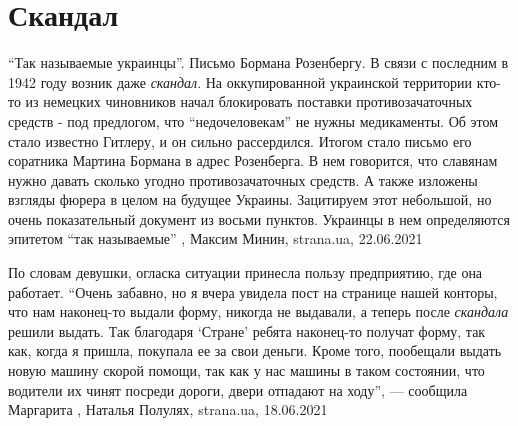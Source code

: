  
 
 
 
 
\chapter{Скандал}
\label{sec:slova.skandal}

\enquote{Так называемые украинцы}. Письмо Бормана Розенбергу.  В связи с последним в
1942 году возник даже \emph{скандал}. На оккупированной украинской территории кто-то
из немецких чиновников начал блокировать поставки противозачаточных средств -
под предлогом, что \enquote{недочеловекам} не нужны медикаменты.  Об этом стало
известно Гитлеру, и он сильно рассердился. Итогом стало письмо его соратника
Мартина Бормана в адрес Розенберга. В нем говорится, что славянам нужно давать
сколько угодно противозачаточных средств. А также изложены взгляды фюрера в
целом на будущее Украины.  Зацитируем этот небольшой, но очень показательный
документ из восьми пунктов. Украинцы в нем определяются эпитетом \enquote{так
называемые}
  , Максим Минин, strana.ua, 22.06.2021

По словам девушки, огласка ситуации принесла пользу предприятию, где она
работает.  \enquote{Очень забавно, но я вчера увидела пост на странице нашей конторы,
что нам наконец-то выдали форму, никогда не выдавали, а теперь после \emph{скандала}
решили выдать. Так благодаря \enquote{Стране} ребята наконец-то получат форму, так как,
когда я пришла, покупала ее за свои деньги. Кроме того, пообещали выдать новую
машину скорой помощи, так как у нас машины в таком состоянии, что водители их
чинят посреди дороги, двери отпадают на ходу}, — сообщила Маргарита
, 
Наталья Полулях, strana.ua, 18.06.2021

